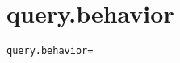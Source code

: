 \section{query.behavior}
\label{configuration:QueryBehavior}
\ClearAPI
\TODO
{}
\begin{lstlisting}[style=Props,caption={Usage example for \textit{query.behavior}}]
query.behavior=
\end{lstlisting}